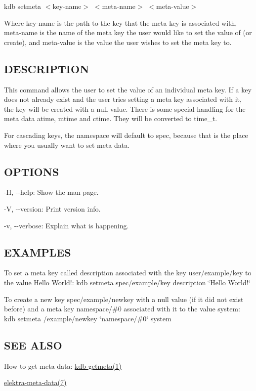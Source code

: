 {\ttfamily kdb setmeta $<$key-\/name$>$ $<$meta-\/name$>$ $<$meta-\/value$>$}

Where {\ttfamily key-\/name} is the path to the key that the meta key is associated with, {\ttfamily meta-\/name} is the name of the meta key the user would like to set the value of (or create), and {\ttfamily meta-\/value} is the value the user wishes to set the meta key to.

\subsection*{D\+E\+S\+C\+R\+I\+P\+T\+I\+O\+N}

This command allows the user to set the value of an individual meta key. If a key does not already exist and the user tries setting a meta key associated with it, the key will be created with a null value. There is some special handling for the meta data atime, mtime and ctime. They will be converted to time\+\_\+t.

For cascading keys, the namespace will default to {\ttfamily spec}, because that is the place where you usually want to set meta data.

\subsection*{O\+P\+T\+I\+O\+N\+S}


\begin{DoxyItemize}
\item {\ttfamily -\/\+H}, {\ttfamily -\/-\/help}\+: Show the man page.
\item {\ttfamily -\/\+V}, {\ttfamily -\/-\/version}\+: Print version info.
\item {\ttfamily -\/v}, {\ttfamily -\/-\/verbose}\+: Explain what is happening.
\end{DoxyItemize}

\subsection*{E\+X\+A\+M\+P\+L\+E\+S}

To set a meta key called {\ttfamily description} associated with the key {\ttfamily user/example/key} to the value {\ttfamily Hello World!}\+: {\ttfamily kdb setmeta spec/example/key description \char`\"{}\+Hello World!\char`\"{}}

To create a new key {\ttfamily spec/example/newkey} with a null value (if it did not exist before) and a meta key {\ttfamily namespace/\#0} associated with it to the value {\ttfamily system}\+: {\ttfamily kdb setmeta /example/newkey \char`\"{}namespace/\#0\char`\"{} system}

\subsection*{S\+E\+E A\+L\+S\+O}


\begin{DoxyItemize}
\item How to get meta data\+: \hyperlink{md_doc_help_kdb-getmeta_doc_help_kdb-getmeta_md}{kdb-\/getmeta(1)}
\item \hyperlink{md_doc_help_elektra-meta-data_doc_help_elektra-meta-data_md}{elektra-\/meta-\/data(7)} 
\end{DoxyItemize}